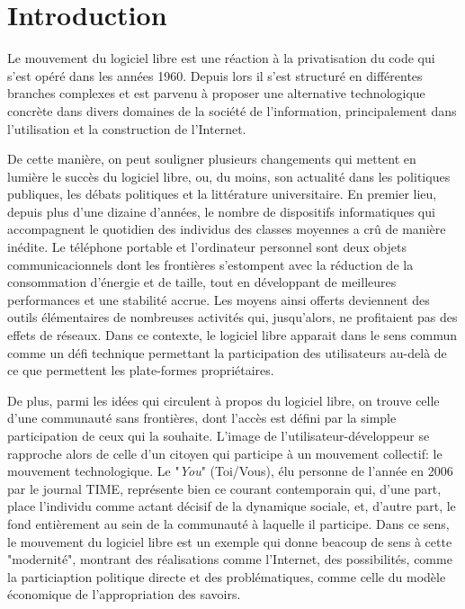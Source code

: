 \chapter*{Introduction}

Le mouvement du logiciel libre est une réaction à la privatisation du code qui s'est opéré dans les années 1960. Depuis lors il s'est structuré en différentes branches complexes et est parvenu à proposer une alternative technologique concrète dans divers domaines de la société de l'information, principalement dans l'utilisation et la construction de l'Internet.

De cette manière, on peut souligner plusieurs changements qui mettent en lumière le succès du logiciel libre, ou, du moins, son actualité dans les politiques publiques, les débats politiques et la littérature universitaire. En premier lieu, depuis plus d'une dizaine d'années, le nombre de dispositifs informatiques qui accompagnent le quotidien des individus des classes moyennes a crû de manière inédite. Le téléphone portable et l'ordinateur personnel sont deux objets communicacionnels dont les frontières s'estompent avec la réduction de la consommation d'énergie et de taille, tout en développant de meilleures performances et une stabilité accrue. Les moyens ainsi offerts deviennent des outils élémentaires de nombreuses activités qui, jusqu'alors, ne profitaient pas des effets de réseaux. Dans ce contexte, le logiciel libre apparait dans le sens commun comme un défi technique permettant la participation des utilisateurs au-delà de ce que permettent les plate-formes propriétaires.

De plus, parmi les idées qui circulent à propos du logiciel libre, on trouve celle d'une communauté sans frontières, dont l'accès est défini par la simple participation de ceux qui la souhaite. L'image de l'utilisateur-développeur se rapproche alors de celle d'un citoyen qui participe à un mouvement collectif: le mouvement technologique. Le "\emph{You}" (Toi/Vous), élu personne de l'année en 2006 par le journal TIME, représente bien ce courant contemporain qui, d'une part, place l'individu comme actant décisif de la dynamique sociale, et, d'autre part, le fond entièrement au sein de la communauté à laquelle il participe. Dans ce sens, le mouvement du logiciel libre est un exemple qui donne beacoup de sens à cette "modernité", montrant des réalisations comme l'Internet, des possibilités, comme la particiaption politique directe et des problématiques, comme celle du modèle économique de l'appropriation des savoirs.


